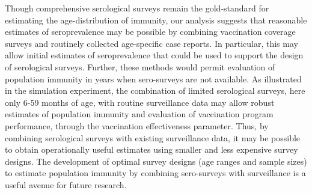 \documentclass[nofootinbib,aps,pre,twocolumn,superscriptaddress,showkeys,showpacs]{revtex4-1}
\begin{document}
Though comprehensive serological surveys remain the gold-standard for estimating the age-distribution of immunity, our analysis suggests that reasonable estimates of seroprevalence may be possible by combining vaccination coverage surveys and routinely collected age-specific case reports.  In particular, this may allow initial estimates of seroprevalence that could be used to support the design of serological surveys.  Further, these methods would permit evaluation of population immunity in years when sero-surveys are not available.  As illustrated in the simulation experiment, the combination of limited serological surveys, here only 6-59 months of age, with routine surveillance data may allow robust estimates of population immunity and evaluation of vaccination program performance, through the vaccination effectiveness parameter.  Thus, by combining serological surveys with existing surveillance data, it may be possible to obtain operationally useful estimates using smaller and less expensive survey designs.  The development of optimal survey designs (age ranges and sample sizes) to estimate population immunity by combining sero-surveys with surveillance is a useful avenue for future research.






\end{document}
